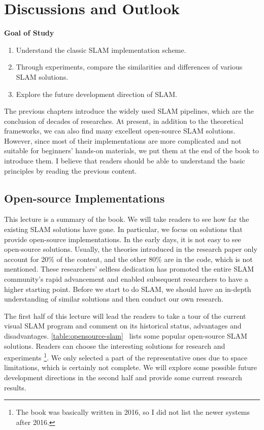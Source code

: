 \chapter{Discussions and Outlook}
\label{cpt:14}
\begin{mdframed}  
	\textbf{Goal of Study}
	\begin{enumerate}[labelindent=0em,leftmargin=1.5em]
		\item Understand the classic SLAM implementation scheme.
		\item Through experiments, compare the similarities and differences of various SLAM solutions.
		\item Explore the future development direction of SLAM.
	\end{enumerate}
\end{mdframed}

The previous chapters introduce the widely used SLAM pipelines, which are the conclusion of decades of researches. At present, in addition to the theoretical frameworks, we can also find many excellent open-source SLAM solutions. However, since most of their implementations are more complicated and not suitable for beginners' hands-on materials, we put them at the end of the book to introduce them. I believe that readers should be able to understand the basic principles by reading the previous content.

\newpage
\section{Open-source Implementations}
This lecture is a summary of the book. We will take readers to see how far the existing SLAM solutions have gone. In particular, we focus on solutions that provide open-source implementations. In the early days, it is not easy to see open-source solutions. Usually, the theories introduced in the research paper only account for 20\% of the content, and the other 80\% are in the code, which is not mentioned. These researchers' selfless dedication has promoted the entire SLAM community's rapid advancement and enabled subsequent researchers to have a higher starting point. Before we start to do SLAM, we should have an in-depth understanding of similar solutions and then conduct our own research.

The first half of this lecture will lead the readers to take a tour of the current visual SLAM program and comment on its historical status, advantages and disadvantages. \autoref{table:opensource-slam}~ lists some popular open-source SLAM solutions. Readers can choose the interesting solutions for research and experiments \footnote{The book was basically written in 2016, so I did not list the newer systems after 2016.}. We only selected a part of the representative ones due to space limitations, which is certainly not complete. We will explore some possible future development directions in the second half and provide some current research results.


